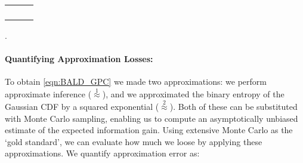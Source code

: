 \documentclass[twoside]{article}
\newcommand{\ourmethod}{BALD } %
\begin{document}
\begin{figure*}
\begin{center}
\begin{tabular}{ccc}
&
&
\\
&
&
\\
&
&
\\
&
&

\end{tabular}
\end{center}
\caption{Test set classification accuracy on classification and preference learning datasets. Methods used are \ourmethod (\ref{plots:BALD}), random query (\ref{plots:rand}), MES (\ref{plots:maxent}), QBC with 2 ($\mbox{QBC}_2$, \ref{plots:QBC2}) and 100 ($\mbox{QBC}_{100}$, \ref{plots:QBC100}) committee members, active SVM (\ref{plots:SVM}), IVM (\ref{plots:IVM}), decision theoretic \cite{kapoor2007} (\ref{plots:dec}), decision theoretic \cite{zhu2003} (\ref{plots:semi}) and empicial error (\ref{plots:emp}). The decision theoretic methods took a long time to run, so were not completed for all datasets. Plots (a-i) are GPC datasets, (j-l) are preference learning.}.
\label{fig:all}
\end{figure*}


\begin{figure*}
\begin{center}

\end{center}
\caption{Summary of results for all classification experiments. $y$-axis denotes the number of additional data points, relative to BALD, required to achieve at least $97.5\%$ of the predictive performance of the entire pool. The `box' denotes 25th to 75th percentile, the red line denotes the median over datasets, and the `whiskers' depict the range. The crosses denote outliers ($>2.7\sigma$ from the mean). Positive values mean that the algorithm required more data points than BALD to achieve the same performance.}
\label{fig:boxandwhisker}
\end{figure*}

\paragraph{Quantifying Approximation Losses:} To obtain \eqref{eqn:BALD_GPC} we made two approximations: we perform approximate inference ({\scriptsize $\stackrel{1}{\approx}$}), and we approximated the binary entropy of the Gaussian CDF by a squared exponential ({\scriptsize $\stackrel{2}{\approx}$}). Both of these can be substituted with Monte Carlo sampling, enabling us to compute an asymptotically unbiased estimate of the expected information gain. Using extensive Monte Carlo as the `gold standard', we can evaluate how much we loose by applying these approximations. We quantify approximation error as: 
\end{document}
